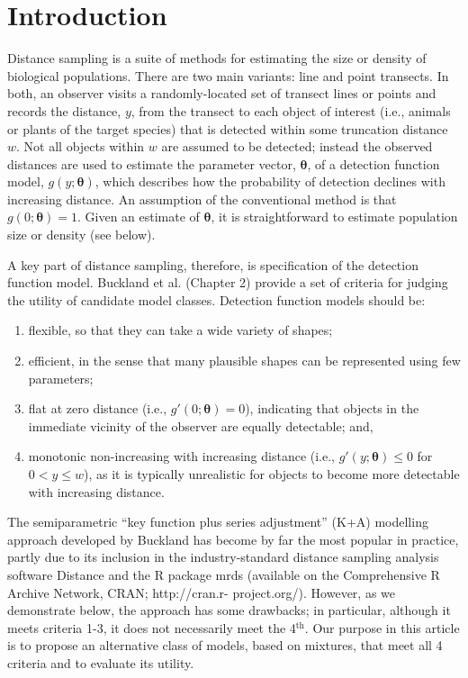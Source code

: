 \documentclass[10pt]{article}
\begin{document}
\section*{Introduction}

Distance sampling \cite{Buckland:2001vm,Buckland:2004ts} is a suite of methods for estimating the size or density of biological populations.  There are two main variants: line and point transects. In both, an observer visits a randomly-located set of transect lines or points and records the distance, $y$, from the transect to each object of interest (i.e., animals or plants of the target species) that is detected within some truncation distance $w$.  Not all objects within $w$ are assumed to be detected; instead the observed distances are used to estimate the parameter vector, $\boldsymbol{\theta}$, of a detection function model, $g(y;\boldsymbol{\theta})$, which describes how the probability of detection declines with increasing distance.  An assumption of the conventional method is that $g(0;\boldsymbol{\theta})=1$. Given an estimate of $\boldsymbol{\theta}$, it is straightforward to estimate population size or density (see below).

A key part of distance sampling, therefore, is specification of the detection function model. Buckland et al. (Chapter 2) \cite{Buckland:2001vm} provide a set of criteria for judging the utility of candidate model classes. Detection function models should be:
\begin{enumerate}
\item flexible, so that they can take a wide variety of shapes;
\item efficient, in the sense that many plausible shapes can be represented using few parameters;
\item flat at zero distance (i.e., $g'(0;\boldsymbol{\theta})=0$), indicating that objects in the immediate vicinity of the observer are equally detectable; and,
\item monotonic non-increasing with increasing distance (i.e., $g'(y;\boldsymbol{\theta}) \leq 0$ for $0<y\leq w$), as it is typically unrealistic for objects to become more detectable with increasing distance.
\end{enumerate}
The semiparametric ``key function plus series adjustment'' (K+A) modelling approach developed by Buckland \cite{Buckland:1992wy} has become by far the most popular in practice, partly due to its inclusion in the industry-standard distance sampling analysis software Distance \cite{Thomas:2010cf} and the R \cite{Team:2013wf} package mrds \cite{mrds} (available on the Comprehensive R Archive Network, CRAN; http://cran.r- project.org/).  However, as we demonstrate below, the approach has some drawbacks; in particular, although it meets criteria 1-3, it does not necessarily meet the 4$^\text{th}$.  Our purpose in this article is to propose an alternative class of models, based on mixtures, that meet all 4 criteria and to evaluate its utility.  
\end{document}
